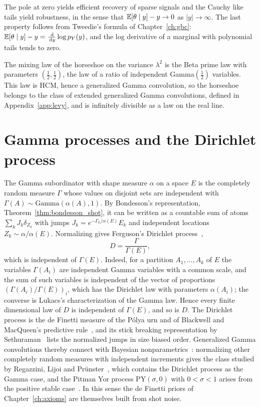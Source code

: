 The pole at zero yields efficient recovery of sparse signals and the Cauchy like tails yield robustness, in the sense that $\mathbb{E}[\theta\mid y]-y\to0$ as $|y|\to\infty$. The last property follows from Tweedie's formula of Chapter~\ref{ch:gbc}: $\mathbb{E}[\theta\mid y]-y = \frac{\,\mathrm{d}}{\,\mathrm{d} y}\log p_Y(y)$, and the log derivative of a marginal with polynomial tails tends to zero.

The mixing law of the horseshoe on the variance $\lambda^2$ is the Beta prime law with parameters $(\frac12,\frac12)$, the law of a ratio of independent Gamma$(\frac12)$ variables. This law is HCM, hence a generalized Gamma convolution, so the horseshoe belongs to the class of extended generalized Gamma convolutions, defined in Appendix~\ref{app:levy}, and is infinitely divisible as a law on the real line.

\section{Gamma processes and the Dirichlet process}

The Gamma subordinator with shape measure $\alpha$ on a space $E$ is the completely random measure $\Gamma$ whose values on disjoint sets are independent with $\Gamma(A)\sim\mathrm{Gamma}(\alpha(A),1)$. By Bondesson's representation, Theorem~\ref{thm:bondesson_shot}, it can be written as a countable sum of atoms $\sum_kJ_k\delta_{Z_k}$ with jumps $J_k = e^{-\Gamma_k/\alpha(E)}E_k$ and independent locations $Z_k\sim\alpha/\alpha(E)$. Normalizing gives Ferguson's Dirichlet process~\cite{ferguson1973},
\[
D = \frac{\Gamma}{\Gamma(E)},
\]
which is independent of $\Gamma(E)$. Indeed, for a partition $A_1,\dots,A_k$ of $E$ the variables $\Gamma(A_i)$ are independent Gamma variables with a common scale, and the sum of such variables is independent of the vector of proportions $(\Gamma(A_i)/\Gamma(E))_i$, which has the Dirichlet law with parameters $\alpha(A_i)$; the converse is Lukacs's characterization of the Gamma law. Hence every finite dimensional law of $D$ is independent of $\Gamma(E)$, and so is $D$. The Dirichlet process is the de Finetti measure of the P\'olya urn and of Blackwell and MacQueen's predictive rule~\cite{blackwell1973}, and its stick breaking representation by Sethuraman~\cite{sethuraman1994} lists the normalized jumps in size biased order. Generalized Gamma convolutions thereby connect with Bayesian nonparametrics~\cite{jamesroynetteyor2008}: normalizing other completely random measures with independent increments gives the class studied by Regazzini, Lijoi and Pr\"unster~\cite{regazzini2003}, which contains the Dirichlet process as the Gamma case, and the Pitman Yor process $\mathrm{PY}(\sigma,0)$ with $0<\sigma<1$ arises from the positive stable case~\cite{pitman1997}. In this sense the de Finetti priors of Chapter~\ref{ch:axioms} are themselves built from shot noise.

